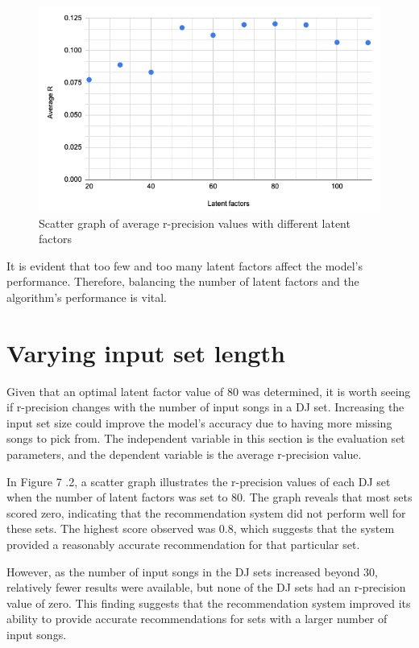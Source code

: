 \begin{figure}[H]
	\includegraphics[scale=0.6]{images/average_r_over_latent}
	\centering
	\caption{Scatter graph of average r-precision values with different latent factors} 
\end{figure}

It is evident that too few and too many latent factors affect the model's performance. Therefore, balancing the number of latent factors and the algorithm's performance is vital.

\section{Varying input set length}
Given that an optimal latent factor value of 80 was determined, it is worth seeing if r-precision changes with the number of input songs in a DJ set. Increasing the input set size could improve the model's accuracy due to having more missing songs to pick from. The independent variable in this section is the evaluation set parameters, and the dependent variable is the average r-precision value.

In Figure 7	.2, a scatter graph illustrates the r-precision values of each DJ set when the number of latent factors was set to 80. The graph reveals that most sets scored zero, indicating that the recommendation system did not perform well for these sets. The highest score observed was 0.8, which suggests that the system provided a reasonably accurate recommendation for that particular set.

However, as the number of input songs in the DJ sets increased beyond 30, relatively fewer results were available, but none of the DJ sets had an r-precision value of zero. This finding suggests that the recommendation system improved its ability to provide accurate recommendations for sets with a larger number of input songs.

